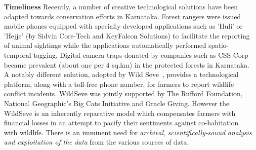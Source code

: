 \documentclass[a4paper,10pt,twocolumn]{article}
\newcommand{\hdg}[1] {\noindent \textbf{#1} }
\begin{document}
\hdg{Timeliness}
Recently, a number of creative technological solutions have been adapted towards conservation efforts in Karnataka. Forest rangers were issued mobile phones equipped with specially developed applications such as 'Huli' or 'Hejje' (by Sidvin Core-Tech and KeyFalcon Solutions) to facilitate the reporting of animal sightings while the applications automatically performed spatio-temporal tagging. Digital camera traps donated by companies such as CSS Corp became prevalent (about one per 4 sq.km) in the protected forests in Karnataka. A notably different solution, adopted by Wild Seve~\cite{wildseve}, provides a technological platform, along with a toll-free phone number, for farmers to report wildlife conflict incidents. WildSeve was jointly supported by The Rufford Foundation, National Geographic's Big Cats Initiative and Oracle Giving. However the WildSeve is an inherently reparative model which compensates farmers with financial losses in an attempt to pacify their sentiments against co-habitation with wildlife. There is an imminent need for \textit{archival, scientifically-sound analysis and exploitation of the data} from the various sources of data. 

\end{document}
